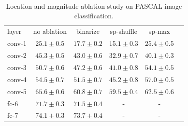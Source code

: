 \setlength{\tabcolsep}{4pt}
\begin{table}[t!]
\begin{center}
\caption{Location and magnitude ablation study on PASCAL image classification.}
\label{table:class-ablation}
\begin{tabular}{lccccc}
\hline\noalign{\smallskip}
layer & no ablation & binarize & sp-shuffle & sp-max \\
\noalign{\smallskip}
\hline
\noalign{\smallskip}
conv-1 & $25.1 \pm 0.5$ & $17.7 \pm 0.2$ & $15.1 \pm 0.3$ & $25.4 \pm 0.5$  \\ 
conv-2 & $45.3 \pm 0.5$ & $43.0 \pm 0.6$ & $32.9 \pm 0.7$ & $40.1 \pm 0.3$  \\ 
conv-3 & $50.7 \pm 0.6$ & $47.2 \pm 0.6$ & $41.0 \pm 0.8$ & $54.1 \pm 0.5$  \\
conv-4 & $54.5 \pm 0.7$ & $51.5 \pm 0.7$ & $45.2 \pm 0.8$ & $57.0 \pm 0.5$  \\
conv-5 & $65.6 \pm 0.6$ & $60.8 \pm 0.7$ & $59.5 \pm 0.4$ & $62.5 \pm 0.6$  \\
fc-6   & $71.7 \pm 0.3$ & $71.5 \pm 0.4$ &  -             &  -   \\
fc-7   & $74.1 \pm 0.3$ & $73.7 \pm 0.4$ &  -             &  -   \\
\hline
\end{tabular}
\end{center}
\end{table}
\setlength{\tabcolsep}{1.4pt}

\setlength{\tabcolsep}{1pt}
\begin{table}[t!]
\begin{center}
\caption{Ablation study on PASCAL object detection using conv-5 features. Feature binarization leads to negligible drop in performance whereas as sp-max causes a large drop.}
\label{table:det-ablation}
\vspace{0.3em}
\end{center}
\end{table}
\setlength{\tabcolsep}{1.4pt}
